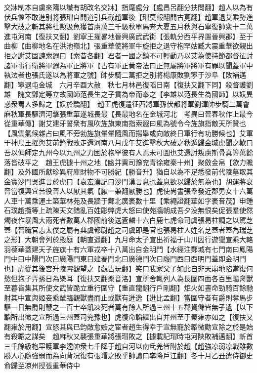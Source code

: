 交牀制本自虜來隋以䜟有胡改名交牀】指麾處分【處昌呂翻分扶問翻】趙人以為有伏兵懼不敢進别將張瑁自閒道引兵截趙軍後【瑁莫報翻閒古莧翻】趙軍退艾乘勢進擊大破之斬其將杜勲汲魚獲首虜萬三千級秋單馬奔大夏五月秋與石寧復帥衆十二萬進屯河南【復扶又翻】劉寧王擢畧地晉興廣武武街【張軌分西平界置晉興郡】至于曲柳【曲柳地名在洪池嶺北】張重華使將軍牛旋拒之退守枹罕姑臧大震重華欲親出拒之謝艾固諫索遐曰【索昔各翻】君者一國之鎮不可輕動乃以艾為使持節都督征討諸軍事行衛將軍遐為軍正將軍【古有軍正黄帝法曰正無屬將軍將軍有罪以聞蓋軍中執法者也張氏遂以為將軍之號】帥步騎二萬拒之别將楊康敗劉寧于沙阜【敗補邁翻】寧退屯金城　六月辛酉大赦　秋七月林邑復䧟日南【復扶又翻下同】殺督護劉雄　隗文鄧定等立故國師范長生之子賁為帝而奉之【李雄以范長生為國師】以妖異惑衆蜀人多歸之【妖於驕翻】　趙王虎復遣征西將軍孫伏都將軍劉渾帥步騎二萬會麻秋軍長驅濟河擊張重華遂城長最【長最地名在金城河北　考異曰晉春秋作上最今從重華傳】謝艾建牙誓衆有風吹旌旗東南指索遐曰風為號令今旌旗指敵天所贊也【風雲氣候雜占曰風不旁勃旌旗暈暈隨風而揚舉或向敵終日軍行有功勝候也】艾軍于神鳥王擢與艾前鋒戰敗走還河南八月戊午艾進擊秋大破之秋遁歸金城虎聞之歎曰吾以偏師定九州今以九州之力困於枹罕彼有人焉未可圖也艾還討叛虜斯骨真等萬餘落皆破平之　趙王虎據十州之地【幽并冀司豫兖青徐雍秦十州】聚斂金帛【歛力贍翻】及外國所獻珍異府庫財物不可勝紀【勝音升】猶自以為不足悉發前代陵墓取其金寶沙門吳進言於虎曰【袁宏漢記曰沙門漢言息也蓋息欲以歸於無為也】胡運將衰晉當復興宜苦役晉人以厭其氣【厭一兼翻厭勝也】虎使尚書張羣發近郡男女十六萬人車十萬乘運土築華林苑及長牆于鄴北廣袤數十里【乘繩證翻華如字袤音茂】申鍾石璞趙攬等上疏陳天文錯亂百姓彫弊虎大怒曰使苑牆朝成吾夕没無恨矣促張羣使然燭夜作暴風大雨死者數萬人郡國前後送蒼麟十六白鹿七虎命司虞張曷柱調之以駕芝蓋【晉職官志太僕之屬有典虞都尉趙之司虞即是官也張曷柱人姓名芝蓋者蓋為瑞芝之形】大朝會列於殿庭【朝直遥翻】九月命太子宣出祈福于山川因行遊獵宣乘大輅羽葆華蓋建天子旌旗十有六軍戎卒十八萬出自金明門【水經注鄴城有七門南曰鳳陽門中曰中陽門次曰廣陽門東曰建春門北曰廣德門次曰廏門西曰西明門蓋即金明門也】虎從其後宮升陵霄觀望之【觀古玩翻】笑曰我家父子如此自非天崩地陷當復何愁但抱子弄孫日為樂耳【復扶又翻樂音洛】宣所舍輒列人為長圍四面各百里驅禽獸至暮皆集其所使文武皆跪立重行圍守【重直龍翻行戶剛翻】炬火如晝命勁騎百餘馳射其中宣與姬妾乘輦臨觀獸盡而止或獸有迸逸【迸比孟翻】當圍守者有爵則奪馬步驅一日無爵則鞭之一百士卒飢凍死者萬有餘人所過三州十五郡資儲皆無孑遺【以下韜所出徵之宣所過三州蓋司兖豫也】虎復命韜繼出自并州至于秦雍亦如之【復扶又翻雍於用翻】宣怒其與已鈞敵愈嫉之宦者趙生得幸于宣無寵於韜微勸宣除之於是始有殺韜之謀矣　趙麻秋又襲張重華將張瑁敗之【據載記瑁時屯河陝敗補邁翻】斬首三千餘級枹罕護軍李逵帥衆七千降于趙自河以南氐羌皆附於趙【趙強凉弱凉戰雖數勝人心隨強弱而為向背况復有張瑁之敗乎帥讀曰率降戶江翻】冬十月乙丑遣侍御史俞歸至凉州授張重華侍中

